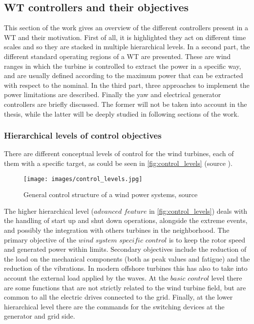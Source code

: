 \subsection{WT controllers and their objectives} \label{subsec:control_objective}
This section of the work gives an overview of the different controllers present in a WT and their motivation. First of all, it is highlighted they act on different time scales and so they are stacked in multiple hierarchical levels. In a second part, the different standard operating regions of a WT are presented. These are wind ranges in which the turbine is controlled to extract the power in a specific way, and are usually defined according to the maximum power that can be extracted with respect to the nominal. In the third part, three approaches to implement the power limitations are described. Finally the yaw and electrical generator controllers are briefly discussed. The former will not be taken into account in the thesis, while the latter will be deeply studied in following sections of the work.  

\subsubsection{Hierarchical levels of control objectives}
There are different conceptual levels of control for the wind turbines, each of them with a specific target, as could be seen in \autoref{fig:control_levels} (source \cite{9535421}).
\begin{figure}[htb]
  \centering
  \texttt{[image: images/control\_levels.jpg]}
  \caption{General control structure of a wind power systems,  source \cite{9535421}}
  \label{fig:control_levels}
\end{figure}

The higher hierarchical level ($\textit{advanced feature}$ in \autoref{fig:control_levels}) deals with the handling of start up and shut down operations, alongside the extreme events, and possibly the integration with others turbines in the neighborhood. The primary objective of the $\textit{wind system specific control}$ is to keep the rotor speed and generated power within limits. Secondary objectives include the reduction of the load on the mechanical components (both as peak values and fatigue) and the reduction of the vibrations. In modern offshore turbines this has also to take into account the external load applied by the waves. At the $\textit{basic control}$ level there are some functions that are not strictly related to the wind turbine field, but are common to all the electric drives connected to the grid. Finally, at the lower hierarchical level there are the commands for the switching devices at the generator and grid side. 

